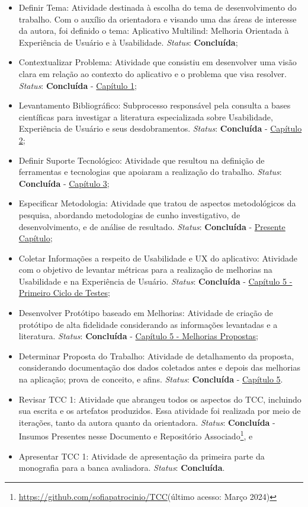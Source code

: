 \begin{itemize}
	\item Definir Tema: Atividade destinada à escolha do tema de desenvolvimento do trabalho. Com o auxílio da orientadora e visando uma das áreas de interesse da autora, foi definido o tema: Aplicativo Multilind: Melhoria Orientada à
	Experiência de Usuário e à Usabilidade. \textit{Status}: \textbf{Concluída};
	\item Contextualizar Problema: Atividade que consistiu em desenvolver uma visão clara em relação ao contexto do aplicativo e o problema que visa resolver. \textit{Status}: \textbf{Concluída} - \hyperref[chap:Introducao]{Capítulo 1};
	\item Levantamento Bibliográfico: Subprocesso responsável pela consulta a bases científicas para investigar a literatura especializada sobre Usabilidade, Experiência de Usuário e seus desdobramentos. \textit{Status}: \textbf{Concluída} - \hyperref[chap:Referencial]{Capítulo 2};
	\item Definir Suporte Tecnológico: Atividade que resultou na definição de ferramentas e tecnologias que apoiaram a realização do trabalho. \textit{Status}: \textbf{Concluída} - \hyperref[chap:ReferencialTech]{Capítulo 3};
	\item Especificar Metodologia: Atividade que tratou de aspectos metodológicos da  pesquisa, abordando metodologias de cunho investigativo, de desenvolvimento, e de análise de resultado. \textit{Status}: \textbf{Concluída} - \hyperref[chap:Metodologia]{Presente Capítulo};
	\item Coletar Informações a respeito de Usabilidade e UX do aplicativo: Atividade com o objetivo de levantar métricas para a realização de melhorias na Usabilidade e na Experiência de Usuário. \textit{Status}: \textbf{Concluída} - \hyperref[sec:Primeiro Ciclo]{Capítulo 5 - Primeiro Ciclo de Testes};
	\item Desenvolver Protótipo baseado em Melhorias: Atividade de criação de protótipo de alta fidelidade considerando as informações levantadas e a literatura. \textit{Status}: \textbf{Concluída} - \hyperref[sec:Melhorias Propostas]{Capítulo 5 - Melhorias Propostas};
	\item Determinar Proposta do Trabalho: Atividade de detalhamento da proposta, considerando documentação dos dados coletados antes e depois das melhorias na aplicação; prova de conceito, e afins. \textit{Status}: \textbf{Concluída} - \hyperref[chap:Aplicativo Multilind]{Capítulo 5}.
	\item Revisar TCC 1: Atividade que abrangeu todos os aspectos do TCC, incluindo sua escrita e os artefatos produzidos. Essa atividade foi realizada por meio de iterações, tanto da autora quanto da orientadora. \textit{Status}: \textbf{Concluída} -  Insumos Presentes nesse Documento e Repositório Associado\footnote{\url{https://github.com/sofiapatrocinio/TCC}(último acesso: Março 2024)}, e
	\item Apresentar TCC 1: Atividade de apresentação da primeira parte da monografia para a banca avaliadora. \textit{Status}: \textbf{Concluída}.
\end{itemize}


